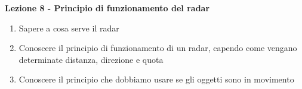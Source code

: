 \documentclass{article}
\begin{document}
	\begin{center}
	\textbf{Lezione 8 - Principio di funzionamento del radar}
	\begin{enumerate}
	\item Sapere a cosa serve il radar
	\item Conoscere il principio di funzionamento di un radar, capendo come vengano determinate distanza, direzione e quota
	\item Conoscere il principio che dobbiamo usare se gli oggetti sono in movimento
	\end{enumerate}
	\end{center}
	
\end{document}
